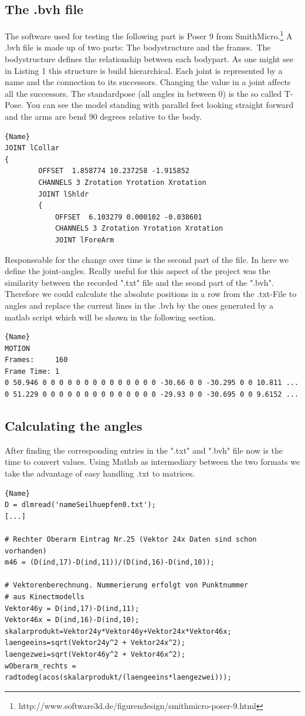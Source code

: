 \documentclass[a4paper]{article}
\begin{document}
\subsection{The .bvh file}
The software used for testing the following part is Poser 9 from SmithMicro.\footnote{http://www.software3d.de/figurendesign/smithmicro-poser-9.html}
A .bvh file is made up of two parts: The bodystructure and the frames.\
The bodystructure defines the relationship between each bodypart. As one might see in
Listing 1 this structure is build hierarchical. Each joint is represented by a name and the connection to its successors. Changing the value in a joint affects all the successors. 
The standardpose (all angles in between 0) is the so called T-Pose. You can see the model standing with parallel feet looking straight forward and the arms are bend 90 degrees relative to the body.
\begin{lstlisting}[caption=.bvh Connected Structure]{Name}
JOINT lCollar
{
		OFFSET	1.858774 10.237258 -1.915852
		CHANNELS 3 Zrotation Yrotation Xrotation
		JOINT lShldr
		{
			OFFSET	6.103279 0.000102 -0.038601
			CHANNELS 3 Zrotation Yrotation Xrotation
			JOINT lForeArm
\end{lstlisting}

Responseable for the change over time is the second part of the file. In here we define the joint-angles. Really useful for this aspect of the project was the similarity between the recorded ".txt" file and the seond part of the ".bvh". Therefore we could calculate the absolute positions in a row from the .txt-File to angles and replace the current lines in the .bvh by the ones generated by a matlab script which will be shown in the following section.
\begin{lstlisting}[caption=Motionpart of .bvh]{Name}
MOTION
Frames:     160
Frame Time: 1                
0 50.946 0 0 0 0 0 0 0 0 0 0 0 0 0 0 -30.66 0 0 -30.295 0 0 10.811 ...
0 51.229 0 0 0 0 0 0 0 0 0 0 0 0 0 0 -29.93 0 0 -30.695 0 0 9.6152 ...
\end{lstlisting}

\subsection{Calculating the angles}
After finding the corresponding entries in the ".txt" and ".bvh" file now is the time to convert values. Using Matlab as  intermediary between the two formats we take the advantage of easy handling .txt to matrices.

\begin{lstlisting}[caption=Calculating the angle]{Name}
D = dlmread('nameSeilhuepfen0.txt');
[...]

# Rechter Oberarm Eintrag Nr.25 (Vektor 24x Daten sind schon vorhanden)
m46 = (D(ind,17)-D(ind,11))/(D(ind,16)-D(ind,10));

# Vektorenberechnung. Nummerierung erfolgt von Punktnummer 
# aus Kinectmodells
Vektor46y = D(ind,17)-D(ind,11);
Vektor46x = D(ind,16)-D(ind,10);
skalarprodukt=Vektor24y*Vektor46y+Vektor24x*Vektor46x;
laengeeins=sqrt(Vektor24y^2 + Vektor24x^2);
laengezwei=sqrt(Vektor46y^2 + Vektor46x^2); 
wOberarm_rechts = radtodeg(acos(skalarprodukt/(laengeeins*laengezwei)));
\end{lstlisting}
\end{document}
